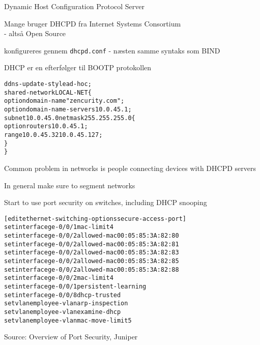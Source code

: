 \documentclass[Screen16to9,17pt]{foils}
\begin{document}

\begin{list1}
\item Dynamic Host Configuration Protocol Server
\item Mange bruger DHCPD fra Internet Systems Consortium\\
   - altså Open Source
\item konfigureres gennem \verb+dhcpd.conf+ - næsten samme syntaks som BIND
\item DHCP er en efterfølger til BOOTP protokollen
\end{list1}

\begin{alltt}
\small
ddns-update-style ad-hoc;
shared-network LOCAL-NET \{
    option  domain-name "zencurity.com";
    option  domain-name-servers 10.0.45.1;
    subnet 10.0.45.0 netmask 255.255.255.0 \{
            option routers 10.0.45.1;
            range 10.0.45.32 10.0.45.127;
    \}
\}
\end{alltt}


\begin{list1}
\item Common problem in networks is people connecting devices with DHCPD servers
\item In general make sure to segment networks
\item Start to use port security on switches, including DHCP snooping\\
\end{list1}


\begin{alltt}\small
[edit ethernet-switching-options secure-access-port]
set interface ge-0/0/1 mac-limit 4
set interface ge-0/0/2 allowed-mac 00:05:85:3A:82:80
set interface ge-0/0/2 allowed-mac 00:05:85:3A:82:81
set interface ge-0/0/2 allowed-mac 00:05:85:3A:82:83
set interface ge-0/0/2 allowed-mac 00:05:85:3A:82:85
set interface ge-0/0/2 allowed-mac 00:05:85:3A:82:88
set interface ge-0/0/2 mac-limit 4
set interface ge-0/0/1 persistent-learning
set interface ge-0/0/8 dhcp-trusted
set vlan employee-vlan arp-inspection
set vlan employee-vlan examine-dhcp
set vlan employee-vlan mac-move-limit 5
\end{alltt}

Source: Overview of Port Security, Juniper\\ {\small{}}
\end{document}
